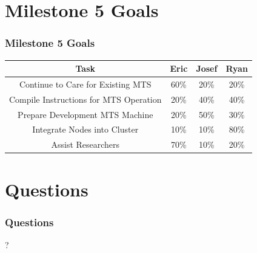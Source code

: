 \documentclass[aspectratio=169]{beamer}
\begin{document}


\section{Milestone 5 Goals}

\begin{frame}

  \frametitle{Milestone 5 Goals}

  \begin{center}
  \begin{tabular}{|c|c|c|c|}
    \hline
    Task & Eric & Josef & Ryan \\
    \hline
    Continue to Care for Existing MTS & 60\% & 20\% & 20\% \\
    Compile Instructions for MTS Operation & 20\% & 40\% & 40\% \\
    Prepare Development MTS Machine & 20\% & 50\% & 30\% \\
    Integrate Nodes into Cluster & 10\% & 10\% & 80\% \\
    Assist Researchers & 70\% & 10\% & 20\% \\
    \hline
  \end{tabular}
\end{center}

\end{frame}



\section{Questions}

\begin{frame}

  \frametitle{Questions}

  \begin{center}
    {\fontsize{200}{200}\selectfont ?}
  \end{center}
  
\end{frame}

\end{document}
